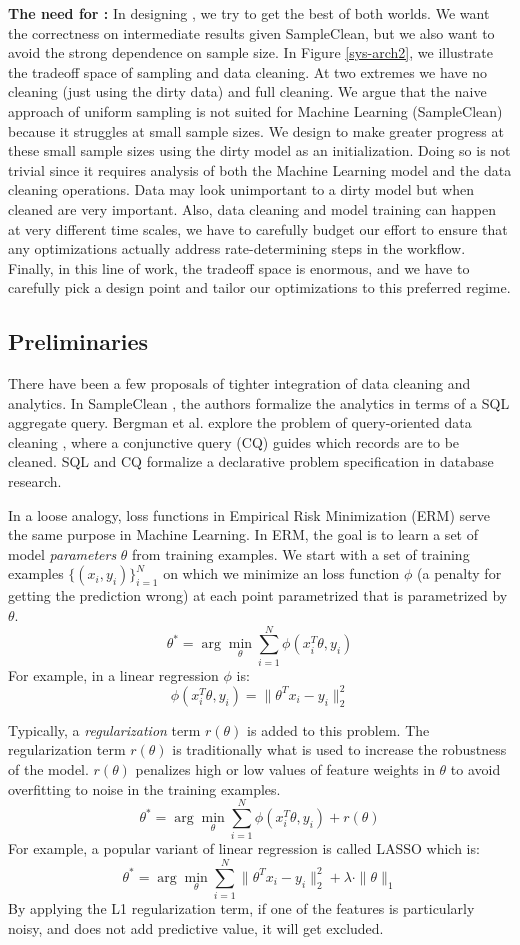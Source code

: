 \noindent\textbf{The need for \sys: } In designing \sys, we try to get the best of both worlds. We want the correctness on intermediate results given SampleClean, but we also want to avoid the strong dependence on sample size. In Figure \ref{sys-arch2}, we illustrate the tradeoff space of sampling and data cleaning.
At two extremes we have no cleaning (just using the dirty data) and full cleaning.
We argue that the naive approach of uniform sampling is not suited for Machine Learning (SampleClean) because it struggles at small sample sizes.
We design \sys to make greater progress at these small sample sizes using the dirty model as an initialization.
Doing so is not trivial since it requires analysis of both the Machine Learning model and the data cleaning operations.
Data may look unimportant to a dirty model but when cleaned are very important.
Also, data cleaning and model training can happen at very different time scales, we have to carefully budget our effort to ensure that any optimizations actually address rate-determining steps in the workflow.
Finally, in this line of work, the tradeoff space is enormous, and we have to carefully pick a design point and tailor our optimizations to this preferred regime.

\subsection{Preliminaries}
There have been a few proposals of tighter integration of data cleaning and analytics.
In SampleClean \cite{wang1999sample}, the authors formalize the analytics in terms of a SQL aggregate query.
Bergman et al. explore the problem of query-oriented data cleaning \cite{bergman2015query}, where a conjunctive query (CQ) guides which records are to be cleaned.
SQL and CQ formalize a declarative problem specification in database research.

In a loose analogy, loss functions in Empirical Risk Minimization (ERM) serve the same purpose in Machine Learning.
In ERM, the goal is to learn a set of model \emph{parameters} $\theta$ from training examples.
We start with a set of training examples $\{(x_{i},y_{i})\}_{i=1}^{N}$
on which we minimize an loss function $\phi$ (a penalty for getting the prediction wrong) at each point parametrized that is parametrized by $\theta$.
\[
 \theta^{*}=\arg\min_{\theta}\sum_{i=1}^{N}\phi(x_{i}^T\theta,y_{i})
\]
For example, in a linear regression $\phi$ is:
\[
\phi(x_{i}^T\theta,y_{i}) = \|\theta^Tx_{i} - y_i \|_2^2
\]

Typically, a \emph{regularization} term $r(\theta)$ is added to this problem.
The regularization term $r(\theta)$ is traditionally what is used to increase the robustness of the model.
$r(\theta)$ penalizes high or low values of feature weights in $\theta$ to avoid overfitting to noise in the
training examples.
\[
 \theta^{*}=\arg\min_{\theta}\sum_{i=1}^{N}\phi(x_{i}^T\theta,y_{i}) + r(\theta)
\]
For example, a popular variant of linear regression is called LASSO which is:
\[
 \theta^{*}=\arg\min_{\theta}\sum_{i=1}^{N}\|\theta^Tx_{i} - y_i \|_2^2 + \lambda \cdot \|\theta\|_1
\]
By applying the L1 regularization term, if one of the features is particularly noisy, and does not add predictive value, it will get excluded.

